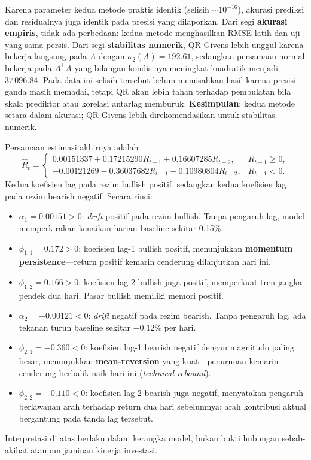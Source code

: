 \documentclass[12pt,a4paper]{article}
\numberwithin{equation}{section}
\begin{document}
Karena parameter kedua metode praktis identik (selisih $\sim 10^{-16}$), akurasi prediksi dan residualnya juga identik pada presisi yang dilaporkan. Dari segi \textbf{akurasi empiris}, tidak ada perbedaan: kedua metode menghasilkan RMSE latih dan uji yang sama persis. Dari segi \textbf{stabilitas numerik}, QR Givens lebih unggul karena bekerja langsung pada $A$ dengan $\kappa_2(A)=192.61$, sedangkan persamaan normal bekerja pada $A^\mathsf{T}A$ yang bilangan kondisinya meningkat kuadratik menjadi $37\,096.84$. Pada data ini selisih tersebut belum memisahkan hasil karena presisi ganda masih memadai, tetapi QR akan lebih tahan terhadap pembulatan bila skala prediktor atau korelasi antarlag memburuk. \textbf{Kesimpulan}: kedua metode setara dalam akurasi; QR Givens lebih direkomendasikan untuk stabilitas numerik.

Persamaan estimasi akhirnya adalah
\begin{equation}
\widehat R_t=\begin{cases}
0.00151337+0.17215290R_{t-1}+0.16607285R_{t-2},&R_{t-1}\geq0,\\
-0.00121269-0.36037682R_{t-1}-0.10980804R_{t-2},&R_{t-1}<0.
\end{cases}
\end{equation}
Kedua koefisien lag pada rezim bullish positif, sedangkan kedua koefisien lag pada rezim bearish negatif. Secara rinci:
\begin{itemize}
\item $\alpha_1=0.00151>0$: \emph{drift} positif pada rezim bullish. Tanpa pengaruh lag, model memperkirakan kenaikan harian baseline sekitar 0.15\%.
\item $\phi_{1,1}=0.172>0$: koefisien lag-1 bullish positif, menunjukkan \textbf{momentum persistence}---return positif kemarin cenderung dilanjutkan hari ini.
\item $\phi_{1,2}=0.166>0$: koefisien lag-2 bullish juga positif, memperkuat tren jangka pendek dua hari. Pasar bullish memiliki memori positif.
\item $\alpha_2=-0.00121<0$: \emph{drift} negatif pada rezim bearish. Tanpa pengaruh lag, ada tekanan turun baseline sekitar $-0.12\%$ per hari.
\item $\phi_{2,1}=-0.360<0$: koefisien lag-1 bearish negatif dengan magnitudo paling besar, menunjukkan \textbf{mean-reversion} yang kuat---penurunan kemarin cenderung berbalik naik hari ini (\emph{technical rebound}).
\item $\phi_{2,2}=-0.110<0$: koefisien lag-2 bearish juga negatif, menyatakan pengaruh berlawanan arah terhadap return dua hari sebelumnya; arah kontribusi aktual bergantung pada tanda lag tersebut.
\end{itemize}
Interpretasi di atas berlaku dalam kerangka model, bukan bukti hubungan sebab-akibat ataupun jaminan kinerja investasi.
\end{document}
